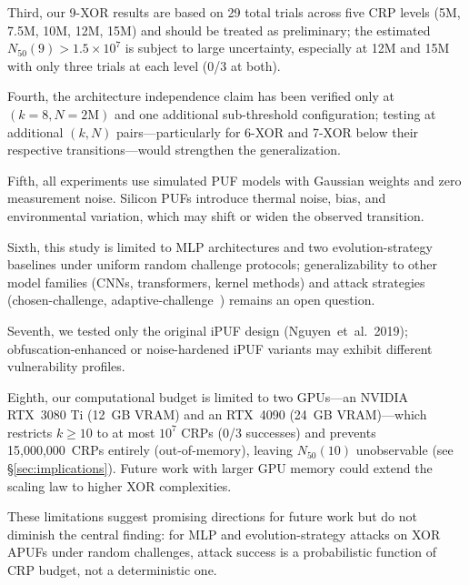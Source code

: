 Third, our 9-XOR results are based on 29 total trials across five CRP
levels (5M, 7.5M, 10M, 12M, 15M) and should be treated as preliminary; the
estimated $N_{50}(9) > 1.5\times10^7$ is subject to large uncertainty,
especially at 12M and 15M with only three trials at each level (0/3 at
both).

Fourth, the architecture independence claim has been verified only at
$(k=8, N=2\text{M})$ and one additional sub-threshold configuration;
testing at additional $(k,N)$ pairs---particularly for 6-XOR and 7-XOR
below their respective transitions---would strengthen the generalization.

Fifth, all experiments use simulated PUF models with Gaussian weights and
zero measurement noise.  Silicon PUFs introduce thermal noise, bias, and
environmental variation, which may shift or widen the observed transition.

Sixth, this study is limited to MLP architectures and two
evolution-strategy baselines under uniform random
challenge protocols; generalizability to other model families (CNNs,
transformers, kernel methods) and attack strategies (chosen-challenge,
adaptive-challenge~\cite{sayadi2025}) remains an open question.

Seventh, we tested only the original iPUF design (Nguyen~et~al.~2019);
obfuscation-enhanced or noise-hardened iPUF variants may exhibit different
vulnerability profiles.

Eighth, our computational budget is limited to two GPUs---an NVIDIA
RTX~3080 Ti (12~GB VRAM) and an RTX~4090 (24~GB VRAM)---which restricts
$k \geq 10$ to at most $10^7$ CRPs (0/3 successes) and prevents
15{,}000{,}000~CRPs entirely (out-of-memory), leaving $N_{50}(10)$
unobservable (see \S\ref{sec:implications}).  Future work with larger GPU
memory could extend the scaling law to higher XOR complexities.

These limitations suggest promising directions for future work but do not
diminish the central finding: for MLP and evolution-strategy attacks on XOR
APUFs under random challenges, attack success is a probabilistic function of
CRP budget, not a deterministic one.

